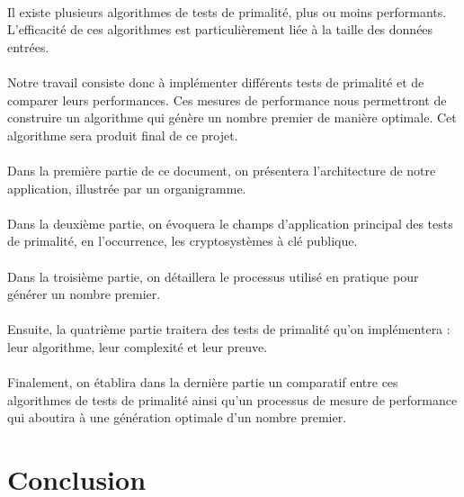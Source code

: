 	\paragraph{}Il existe plusieurs algorithmes de tests de primalité, plus ou moins performants. L'efficacité de ces algorithmes est particulièrement liée à la taille des données entrées. 
	\paragraph{}Notre travail consiste donc à implémenter différents tests de primalité et de comparer leurs performances. Ces mesures de performance nous permettront de construire un algorithme qui génère un nombre premier de manière optimale. Cet algorithme sera produit final de ce projet. 
	\paragraph{}Dans la première partie de ce document, on présentera l'architecture de notre application, illustrée par un organigramme.
	\paragraph{}Dans la deuxième partie, on évoquera le champs d'application principal des tests de primalité, en l'occurrence, les cryptosystèmes à clé publique.
	\paragraph{}Dans la troisième partie, on détaillera le processus utilisé en pratique pour générer un nombre premier.
	\paragraph{}Ensuite, la quatrième partie traitera des tests de primalité qu'on implémentera : leur algorithme, leur complexité et leur preuve.
	\paragraph{}Finalement, on établira dans la dernière partie un comparatif entre ces algorithmes de tests de primalité ainsi qu'un processus de mesure de performance qui aboutira à une génération optimale d'un nombre premier.
	
	
	
	
	
	
	
	
	
	
	
	
	
	\section*{Conclusion}
	
		

